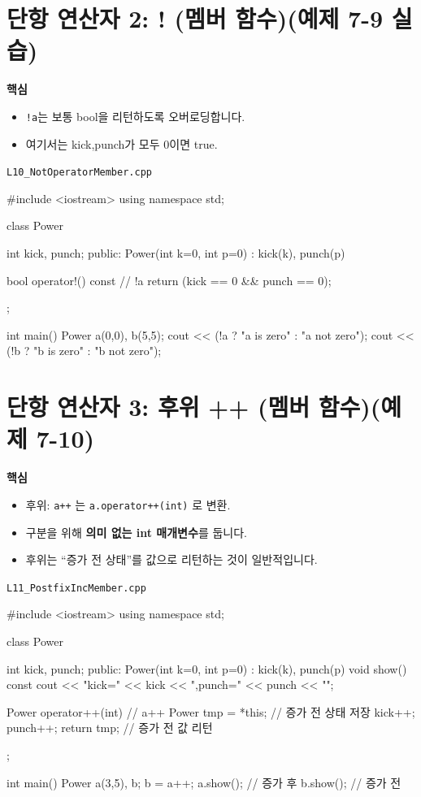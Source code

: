 \documentclass[11pt,a4paper]{article}
\newcommand{\filetag}[1]{\texttt{\color{Accent}#1}}
\begin{document}
\section{단항 연산자 2: ! (멤버 함수)(예제 7-9 실습)}
\begin{GoalBox}
\textbf{핵심}
\begin{itemize}[leftmargin=18pt]
  \item \texttt{!a}는 보통 bool을 리턴하도록 오버로딩합니다.
  \item 여기서는 kick,punch가 모두 0이면 true.
\end{itemize}
\end{GoalBox}

\noindent\filetag{L10\_NotOperatorMember.cpp}
\begin{cppcode}
#include <iostream>
using namespace std;

class Power {
    int kick, punch;
public:
    Power(int k=0, int p=0) : kick(k), punch(p) {}

    bool operator!() const { // !a
        return (kick == 0 && punch == 0);
    }
};

int main() {
    Power a(0,0), b(5,5);
    cout << (!a ? "a is zero\n" : "a not zero\n");
    cout << (!b ? "b is zero\n" : "b not zero\n");
}
\end{cppcode}

\section{단항 연산자 3: 후위 ++ (멤버 함수)(예제 7-10)}
\begin{GoalBox}
\textbf{핵심}
\begin{itemize}[leftmargin=18pt]
  \item 후위: \texttt{a++} 는 \texttt{a.operator++(int)} 로 변환.
  \item 구분을 위해 \textbf{의미 없는 int 매개변수}를 둡니다.
  \item 후위는 ``증가 전 상태''를 값으로 리턴하는 것이 일반적입니다.
\end{itemize}
\end{GoalBox}

\noindent\filetag{L11\_PostfixIncMember.cpp}
\begin{cppcode}
#include <iostream>
using namespace std;

class Power {
    int kick, punch;
public:
    Power(int k=0, int p=0) : kick(k), punch(p) {}
    void show() const { cout << "kick=" << kick << ",punch=" << punch << "\n"; }

    Power operator++(int) { // a++
        Power tmp = *this;  // 증가 전 상태 저장
        kick++; punch++;
        return tmp;         // 증가 전 값 리턴
    }
};

int main() {
    Power a(3,5), b;
    b = a++;
    a.show(); // 증가 후
    b.show(); // 증가 전
}
\end{cppcode}
\end{document}
